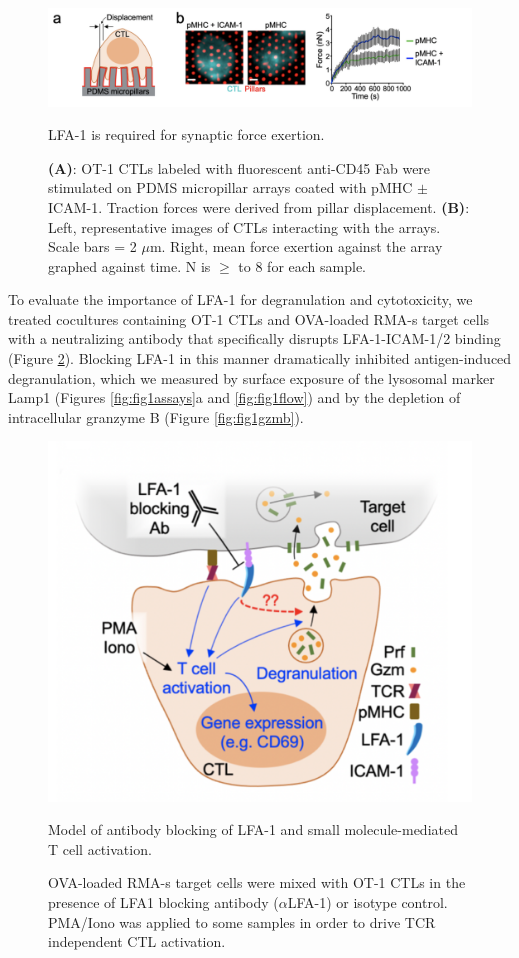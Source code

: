 \begin{figure}[htbp]
	\centering
	\includegraphics[width=\textwidth]{../figures/chapter3/fig1pillarswithouticam.png}
	\caption{LFA-1 is required for synaptic force exertion.}
	\caption*{\textbf{(A)}: OT-1 CTLs labeled with fluorescent anti-CD45 Fab were stimulated on PDMS micropillar arrays coated with pMHC $\pm$ ICAM-1. Traction forces were derived from pillar displacement.  \textbf{(B)}: Left, representative images of CTLs interacting with the arrays. Scale bars = 2 $\mu$m.  Right, mean force exertion against the array graphed against time. N is $\geq$ to 8 for each sample.}
	\label{fig:fig1pillarswithouticam}
\end{figure}

To evaluate the importance of LFA-1 for degranulation and cytotoxicity, we treated cocultures containing OT-1 CTLs and OVA-loaded RMA-s target cells with a neutralizing antibody that specifically disrupts LFA-1-ICAM-1/2 binding (Figure \ref{fig:fig1lfablockmodel}). Blocking LFA-1 in this manner dramatically inhibited antigen-induced degranulation, which we measured by surface exposure of the lysosomal marker Lamp1 (Figures \ref{fig:fig1assays}a and \ref{fig:fig1flow}) and by the depletion of intracellular granzyme B (Figure \ref{fig:fig1gzmb}). 

\begin{figure}[htbp]
	\centering
	\includegraphics[width=0.9\columnwidth]{../figures/chapter3/fig1lfablockmodel.png}
	\caption{Model of antibody blocking of LFA-1 and small molecule-mediated T cell activation.}
	\caption*{OVA-loaded RMA-s target cells were mixed with OT-1 CTLs in the presence of LFA1 blocking antibody ($\alpha$LFA-1) or isotype control. PMA/Iono was applied to some samples in order to drive TCR independent CTL activation.}
	\label{fig:fig1lfablockmodel}
\end{figure}


